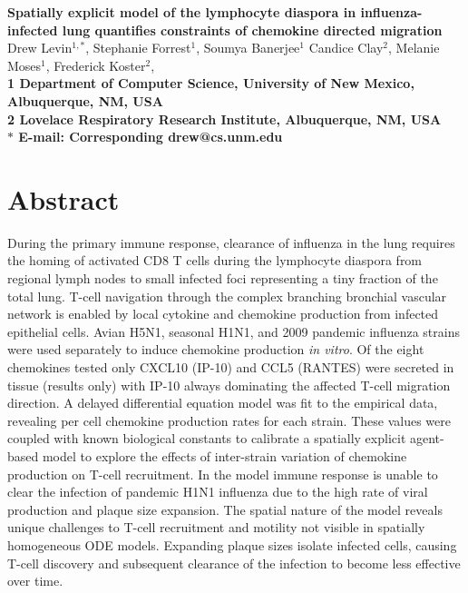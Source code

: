 \documentclass[10pt]{article}
\date{}
\begin{document}
\begin{flushleft}
{\Large
\textbf{Spatially explicit model of the lymphocyte diaspora in influenza-infected lung quantifies constraints of chemokine directed migration}
}
\\
Drew Levin$^{1,\ast}$, 
Stephanie Forrest$^{1}$, 
Soumya Banerjee$^{1}$
Candice Clay$^{2}$, 
Melanie Moses$^{1}$, 
Frederick Koster$^{2}$, 
\\
\bf{1} Department of Computer Science, University of New Mexico, Albuquerque, NM, USA
\\
\bf{2} Lovelace Respiratory Research Institute, Albuquerque, NM, USA
\\
$\ast$ E-mail: Corresponding drew@cs.unm.edu
\end{flushleft}



\section*{Abstract}

During the primary immune response, clearance of influenza in the lung requires the homing of activated CD8 T cells during the lymphocyte diaspora from regional lymph nodes to small infected foci representing a tiny fraction of the total lung.  T-cell navigation through the complex branching bronchial vascular network is enabled by local cytokine and chemokine production from infected epithelial cells.  Avian H5N1, seasonal H1N1, and 2009 pandemic influenza strains were used separately to induce chemokine production \textit{in vitro}.  Of the eight chemokines tested only CXCL10 (IP-10) and CCL5 (RANTES) were secreted in tissue  (results only) with IP-10 always dominating the affected T-cell migration direction.  A delayed differential equation model was fit to the empirical data, revealing per cell chemokine production rates for each strain.  These values were coupled with known biological constants to calibrate a spatially explicit agent-based model to explore the effects of inter-strain variation of chemokine production on T-cell recruitment.  In the model immune response is unable to clear the infection of pandemic H1N1 influenza due to the high rate of viral production and plaque size expansion.  The spatial nature of the model reveals unique challenges to T-cell recruitment and motility not visible in spatially homogeneous ODE models.  Expanding plaque sizes isolate infected cells, causing T-cell discovery and subsequent clearance of the infection to become less effective over time.  
\end{document}
